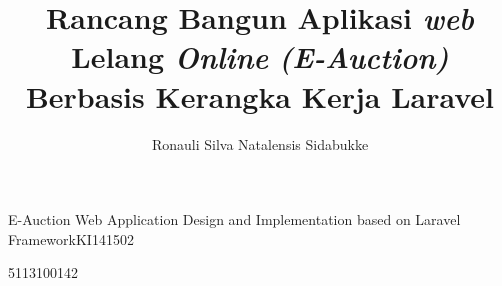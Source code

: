 
\title{Rancang Bangun Aplikasi \textit{web} Lelang \textit{Online} \textit{(E-Auction)} Berbasis Kerangka Kerja Laravel}{E-Auction Web Application Design and Implementation based on Laravel Framework}{KI141502} 

\author{Ronauli Silva Natalensis Sidabukke}{5113100142}




